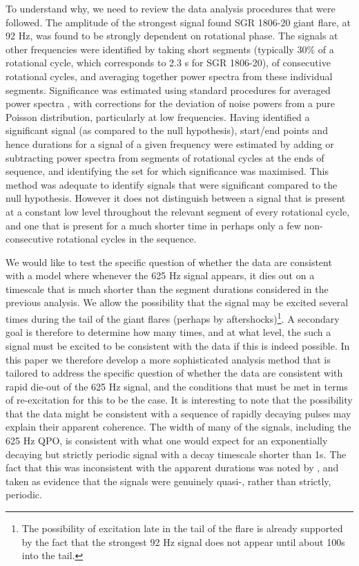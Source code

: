 \documentclass{emulateapj}
\begin{document}
To understand why, we need to review the data analysis procedures that were followed. The amplitude of the strongest signal found SGR 1806-20 giant flare, at 92 Hz, was found to be strongly dependent on rotational phase. The signals at other frequencies were identified by taking short segments (typically 30\% of a rotational cycle, which corresponds to 2.3 s for SGR 1806-20), of consecutive rotational cycles, and averaging together power spectra from these individual segments. Significance was estimated using standard procedures for averaged power spectra \citep{vanderKlis89}, with corrections for the deviation of noise powers from a pure Poisson distribution, particularly at low frequencies. Having identified a significant signal (as compared to the null hypothesis), start/end points and hence durations for a signal of a given frequency were estimated by adding or subtracting power spectra from segments of rotational cycles at the ends of sequence, and identifying the set for which significance was maximised. This method was adequate to identify signals that were significant compared to the null hypothesis. However it does not distinguish between a signal that is present at a constant low level throughout the relevant segment of every rotational cycle, and one that is present for a much shorter time in perhaps only a few non-consecutive rotational cycles in the sequence.

We would like to test the specific question of whether the data are consistent with a model where whenever the 625 Hz signal appears, it dies out on a timescale that is much shorter than the segment durations considered in the previous analysis. We allow the possibility that the signal may be excited several times during the tail of the giant flares (perhaps by aftershocks)\footnote{The possibility of excitation late in the tail of the flare is already supported by the fact that the strongest 92 Hz signal does not appear until about 100s into the tail.}. A secondary goal is therefore to determine how many times, and at what level, the such a signal must be excited to be consistent with the data if this is indeed possible. In this paper we therefore develop a more sophisticated analysis method that is tailored to address the specific question of whether the data are consistent with rapid die-out of the 625 Hz signal, and the conditions that must be met in terms of re-excitation for this to be the case. It is interesting to note that the possibility that the data might be consistent with a sequence of rapidly decaying pulses may explain their apparent coherence. The width of many of the signals, including the 625 Hz QPO, is consistent with what one would expect for an exponentially decaying but strictly periodic signal with a decay timescale shorter than 1s. The fact that this was inconsistent with the apparent durations was noted by \citet{Watts11}, and taken as evidence that the signals were genuinely quasi-, rather than strictly, periodic.
\end{document}
